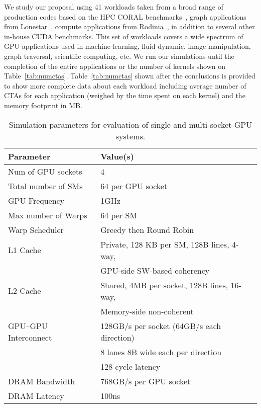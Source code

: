 We study our proposal using 41 workloads taken from a broad range of 
production codes based on the HPC CORAL benchmarks~\cite{coral}, graph 
applications from Lonestar~\cite{lonestar}, compute applications from 
Rodinia~\cite{Che2009}, in addition to several other in-house CUDA benchmarks. 
This set of workloads covers a wide spectrum of GPU applications used in 
machine 
learning, fluid dynamic, image manipulation, graph traversal, scientific 
computing, etc. We run our simulations until the completion of the entire 
applications or the number of kernels shown on Table~\ref{tab:numctas}.
Table~\ref{tab:numctas} shown after the conclusions is provided to show
more complete data about each workload including average number of CTAs for each
application (weighed by the time spent on each kernel) and the memory 
footprint in MB.

\begin{table}[tp]
\begin{small}
\centering
\begin{tabular}{ll}
\toprule
\textbf{Parameter} & \textbf{Value(s)} \\
\toprule
Num of GPU sockets & 4 \\
\midrule
Total number of SMs & 64 per GPU socket \\
\midrule
GPU Frequency & 1GHz \\
\midrule
Max number of Warps & 64 per SM \\
\midrule
Warp Scheduler & Greedy then Round Robin \\
\midrule
L1 Cache & Private, 128 KB per SM, 128B lines, 4-way, \\ 
& GPU-side SW-based coherency \\
\midrule
L2 Cache & Shared, 4MB per socket, 128B lines, 16-way, \\ 
& Memory-side non-coherent\\
\midrule
GPU--GPU Interconnect & 128GB/s per socket (64GB/s each direction) \\
& 8 lanes 8B wide each per direction \\
&128-cycle latency \\
\midrule
DRAM Bandwidth & 768GB/s per GPU socket\\
\midrule
DRAM Latency & 100ns \\
\toprule
\end{tabular}
\caption{Simulation parameters for evaluation of single and multi-socket GPU 
systems.}
\label{tab:setup}
\end{small}
\end{table} 


